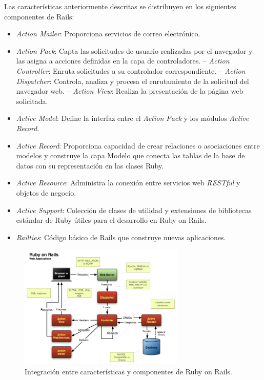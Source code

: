 Las características anteriormente descritas se distribuyen en los siguientes componentes de Rails:
\begin{itemize}
\item \textit{Action Mailer}: Proporciona servicios de correo electrónico. 
\item \textit{Action Pack}: Capta las solicitudes de usuario realizadas por el navegador y las asigna a acciones definidas en la capa de controladores.
\subitem-- \textit{Action Controller}: Enruta solicitudes a su controlador correspondiente. 
\subitem-- \textit{Action Dispatcher}: Controla, analiza y procesa el enrutamiento de la solicitud del navegador web.
\subitem-- \textit{Action View}: Realiza la presentación de la página web solicitada.
\item \textit{Active Model}: Define la interfaz entre el \textit{Action Pack} y los módulos \textit{Active Record}.
\item \textit{Active Record}: Proporciona capacidad de crear relaciones o asociaciones entre modelos y construye la capa Modelo que conecta las tablas de la base de datos con su representación en las clases Ruby.
\item \textit{Active Resource}: Administra la conexión entre servicios web \textit{RESTful} y objetos de negocio.
\item \textit{Active Support}: Colección de clases de utilidad y extensiones de bibliotecas estándar de Ruby útiles para el desarrollo en Ruby on Rails.
\item \textit{Railties}: Código básico de Rails que construye nuevas aplicaciones. 
\end{itemize}	 

\begin{figure}[H]
\centering
\includegraphics[width=0.7\textwidth]{images/figures/rubyonrails.png}
\caption{Integración entre características y componentes de Ruby on Rails.}
\end{figure}

